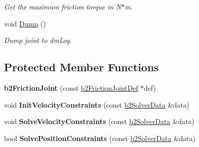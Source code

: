 \begin{DoxyCompactItemize}
\begin{DoxyCompactList}\small\item\em Get the maximum friction torque in N$\ast$m. \end{DoxyCompactList}\item 
\hypertarget{classb2_friction_joint_a9a27084c9f4a7ea0a4f590f687ac1edb}{void \hyperlink{classb2_friction_joint_a9a27084c9f4a7ea0a4f590f687ac1edb}{Dump} ()}\label{classb2_friction_joint_a9a27084c9f4a7ea0a4f590f687ac1edb}

\begin{DoxyCompactList}\small\item\em Dump joint to dm\-Log. \end{DoxyCompactList}\end{DoxyCompactItemize}
\subsection*{Protected Member Functions}
\begin{DoxyCompactItemize}
\item 
\hypertarget{classb2_friction_joint_a7413c5f289257f0e993b7e750fe95b99}{{\bfseries b2\-Friction\-Joint} (const \hyperlink{structb2_friction_joint_def}{b2\-Friction\-Joint\-Def} $\ast$def)}\label{classb2_friction_joint_a7413c5f289257f0e993b7e750fe95b99}

\item 
\hypertarget{classb2_friction_joint_a72fbe2a2dce2c90e1b68395e715e1254}{void {\bfseries Init\-Velocity\-Constraints} (const \hyperlink{structb2_solver_data}{b2\-Solver\-Data} \&data)}\label{classb2_friction_joint_a72fbe2a2dce2c90e1b68395e715e1254}

\item 
\hypertarget{classb2_friction_joint_a5aab459109e198a75e0151f36d50ee65}{void {\bfseries Solve\-Velocity\-Constraints} (const \hyperlink{structb2_solver_data}{b2\-Solver\-Data} \&data)}\label{classb2_friction_joint_a5aab459109e198a75e0151f36d50ee65}

\item 
\hypertarget{classb2_friction_joint_ac1998353c72787b6074b2ef50dd1c2d2}{bool {\bfseries Solve\-Position\-Constraints} (const \hyperlink{structb2_solver_data}{b2\-Solver\-Data} \&data)}\label{classb2_friction_joint_ac1998353c72787b6074b2ef50dd1c2d2}

\end{DoxyCompactItemize}
